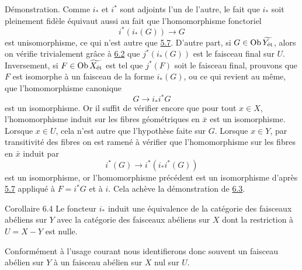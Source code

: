 \documentclass[10pt]{../fichiers-configuration-latex/smfart}
\begin{document}
Démonstration. Comme $i_{\ast}$ et $i^{\ast}$ sont adjoints l'un de
l'autre, le fait que $i_{\ast}$ soit pleinement fidèle équivaut
aussi au fait que l'homomorphisme fonctoriel
$$
i^{\ast} (i_{\ast}(G)) \to G
$$
est un\pageoriginale isomorphisme, ce qui n'est autre que
\hyperref[VIII.cor5.7]{5.7}. D'autre part, si $G \in \operatorname{Ob}
\widetilde{Y_{\text{ét}}}$, alors on vérifie trivialement grâce à
\hyperref[VIII.cor6.2]{6.2} que $j^{\ast} (i_{\ast}(G))$ est le faisceau final
sur $U$. Inversement, si $F \in \operatorname{Ob} \widetilde{X_{\text{ét}}}$ est
tel que $j^{\ast}(F)$ soit le faisceau final, prouvons que $F$ est
isomorphe à un faisceau de la forme $i_{\ast}(G)$, ou ce qui revient
au même, que l'homomorphisme canonique
$$
G \to i_{\ast} i^{\ast} G
$$
est un isomorphisme. Or il suffit de vérifier encore que pour tout $x
\in X$, l'homomorphisme induit sur les fibres géométriques en
$\bar{x}$ est un isomorphisme. Lorsque $x \in U$, cela n'est autre que
l'hypothèse faite sur $G$. Lorsque $x \in Y$, par transitivité des
fibres on est ramené à vérifier que l'homomorphisme sur les fibres en
$\bar{x}$ induit par
$$
i^{\ast} (G) \to i^{\ast} (i_{\ast} i^{\ast} (G))
$$
est un isomorphisme, or l'homomorphisme précédent est un isomorphisme
d'après \hyperref[VIII.cor5.7]{5.7} appliqué à $F = i^{\ast} G$ et à $i$. Cela achève la
démonstration de \hyperref[VIII.thm6.3]{6.3}.

\begin{enonce*}{Corollaire 6.4}
Le foncteur $i_{\ast}$ induit une équivalence de la catégorie des
faisceaux abéliens sur $Y$ avec la catégorie des faisceaux abéliens
sur $X$ dont la restriction à $U = X - Y$ est nulle.
\end{enonce*}

Conformément à l'usage courant nous identifierons donc souvent un
faisceau abélien sur $Y$  à un faisceau abélien sur $X$ nul sur $U$.

\setcounter{subsection}{4}
\subsection{}
\end{document}
